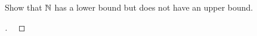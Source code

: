 \documentclass[11pt,openany]{article}
\begin{document}
\newpage
\begin{exercise*}
	Show that $\mathbb{N}$ has a lower bound but does not have an upper bound.
	\begin{proof}[\sol]
		\
\vfill
	\end{proof}
\end{exercise*}
\end{document}

